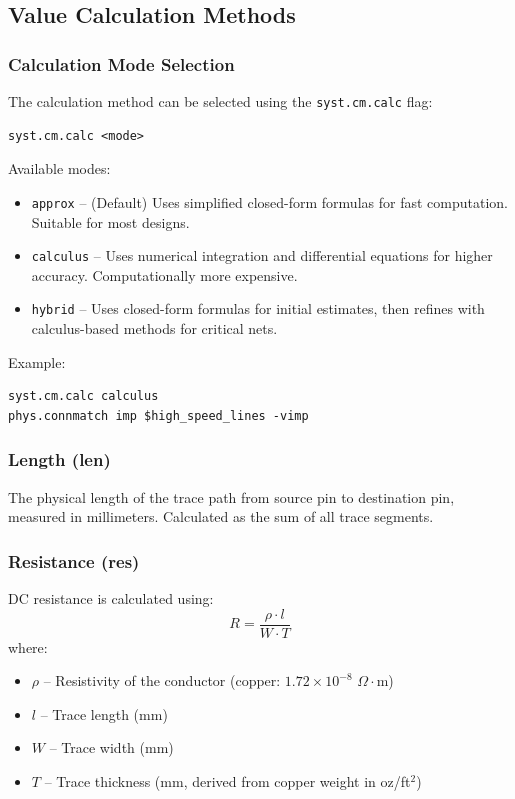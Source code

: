 \documentclass{report}
\begin{document}
\subsection{Value Calculation Methods}

\subsubsection{Calculation Mode Selection}
The calculation method can be selected using the \texttt{syst.cm.calc} flag:
\begin{verbatim}
syst.cm.calc <mode>
\end{verbatim}

Available modes:
\begin{itemize}
\item \texttt{approx} -- (Default) Uses simplified closed-form formulas for fast computation. Suitable for most designs.
\item \texttt{calculus} -- Uses numerical integration and differential equations for higher accuracy. Computationally more expensive.
\item \texttt{hybrid} -- Uses closed-form formulas for initial estimates, then refines with calculus-based methods for critical nets.
\end{itemize}

Example:
\begin{verbatim}
syst.cm.calc calculus
phys.connmatch imp $high_speed_lines -vimp
\end{verbatim}

\subsubsection{Length (len)}
The physical length of the trace path from source pin to destination pin, measured in millimeters. Calculated as the sum of all trace segments.

\subsubsection{Resistance (res)}
DC resistance is calculated using:
\begin{equation}
R = \frac{\rho \cdot l}{W \cdot T}
\end{equation}
where:
\begin{itemize}
\item $\rho$ -- Resistivity of the conductor (copper: $1.72 \times 10^{-8}$ $\Omega\cdot$m)
\item $l$ -- Trace length (mm)
\item $W$ -- Trace width (mm)
\item $T$ -- Trace thickness (mm, derived from copper weight in oz/ft$^2$)
\end{itemize}
\end{document}
